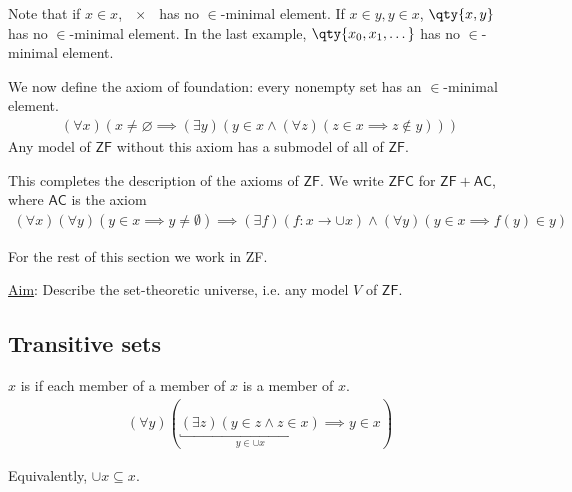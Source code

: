 \begin{enumerate}
    Note that if $x \in x$, $\qty{x}$ has no $\in$-minimal element.
    If $x \in y, y \in x$, $\qty{x, y}$ has no $\in$-minimal element.
    In the last example, $\qty{x_0, x_1, \dots}$ has no $\in$-minimal element.

    We now define the axiom of foundation: every nonempty set has an $\in$-minimal element.
    \begin{align*}
        (\forall x)(x \neq \varnothing \implies (\exists y)(y \in x \wedge (\forall z)(z \in x \implies z \not\in y)))
    \end{align*}
    Any model of $\mathsf{ZF}$ without this axiom has a submodel of all of $\mathsf{ZF}$.
\end{enumerate}

This completes the description of the axioms of $\mathsf{ZF}$.
We write $\mathsf{ZFC}$ for $\mathsf{ZF} + \mathsf{AC}$, where $\mathsf{AC}$ is the axiom
\begin{align*}
    (\forall x)(\forall y)(y \in x \implies y \neq \emptyset) \implies (\exists f)(f: x \to \cup x) \wedge (\forall y)(y \in x \implies f(y) \in y)
\end{align*}

For the rest of this section we work in ZF.

\underline{Aim}: Describe the set-theoretic universe, i.e. any model $V$ of $\mathsf{ZF}$.

\subsection{Transitive sets}

\begin{definition}[Transitive]
    $x$ is  if each member of a member of $x$ is a member of $x$.
    \begin{align*}
        (\forall y)(\underbracket{(\exists z)(y \in z \wedge z \in x)}_{y \in \cup x} \implies y \in x)
    \end{align*}
\end{definition}

Equivalently, $\cup x \subseteq x$.

